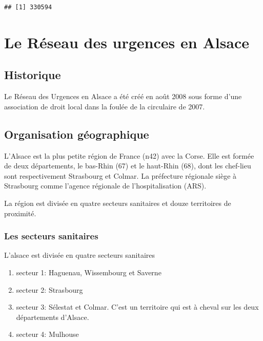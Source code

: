 \documentclass[12pt,english,french,twoside]{report}\usepackage[]{graphicx}\usepackage[]{color}
\makeatletter
\newenvironment{kframe}{%
 \def\at@end@of@kframe{}%
 \ifinner\ifhmode%
  \def\at@end@of@kframe{\end{minipage}}%
  \begin{minipage}{\columnwidth}%
 \fi\fi%
 \def\FrameCommand##1{\hskip\@totalleftmargin \hskip-\fboxsep
 \colorbox{shadecolor}{##1}\hskip-\fboxsep
     \hskip-\linewidth \hskip-\@totalleftmargin \hskip\columnwidth}%
 \MakeFramed {\advance\hsize-\width
   \@totalleftmargin\z@ \linewidth\hsize
   \@setminipage}}%
 {\par\unskip\endMakeFramed%
 \at@end@of@kframe}
\newenvironment{knitrout}{}{} %
\makeatother
\begin{document}
\tableofcontents
\listoftables
\listoffigures

\begin{knitrout}
\color{fgcolor}\begin{kframe}
\begin{verbatim}
## [1] 330594
\end{verbatim}
\end{kframe}
\end{knitrout}


\part{Le Réseau des urgences en Alsace}
\newpage

\chapter{Historique}


Le Réseau des Urgences en Alsace a été créé en août 2008 sous forme d'une association de droit local dans la foulée de la circulaire de 2007.


\cite{16}


\newpage
\chapter{Organisation géographique}


L'Alsace est la plus petite région de France (n42) avec la Corse. Elle est formée de deux départements, le bas-Rhin (67) et le haut-Rhin (68), dont les chef-lieu sont respectivement Strasbourg et Colmar. La préfecture régionale siège à Strasbourg comme l'agence régionale de l'hospitalisation  (ARS).

La région est divisée en quatre secteurs sanitaires et douze territoires de proximité.

\section{Les secteurs sanitaires}

L'alsace est divisée en quatre secteurs sanitaires
\begin{enumerate}
  \item secteur 1: Haguenau, Wissembourg et Saverne
  \item secteur 2: Strasbourg
  \item secteur 3: Sélestat et Colmar. C'est un territoire qui est à cheval sur les deux départements d'Alsace.
  \item secteur 4: Mulhouse
\end{enumerate}
\end{document}
